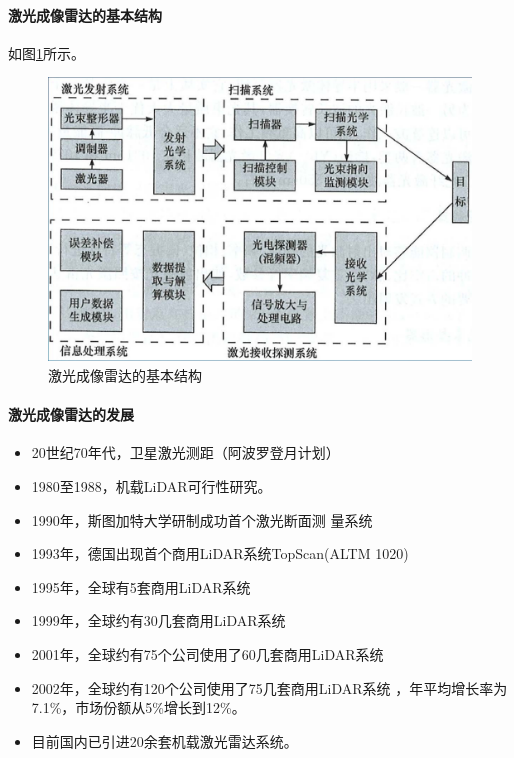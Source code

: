 \paragraph{激光成像雷达的基本结构} 如图\ref{fig:激光成像雷达的基本结构}所示。
\begin{figure}[htbp]
	\centering
	\includegraphics[width=0.7\linewidth]{figure/Chapter1/激光成像雷达的基本结构.jpg}
	\caption{激光成像雷达的基本结构}
	\label{fig:激光成像雷达的基本结构}
\end{figure}
\paragraph{激光成像雷达的发展}
\begin{itemize}
	\item 20世纪70年代，卫星激光测距（阿波罗登月计划）
	\item 1980至1988，机载LiDAR可行性研究。
	\item 1990年，斯图加特大学研制成功首个激光断面测 量系统
	\item 1993年，德国出现首个商用LiDAR系统TopScan(ALTM 1020)
	\item 1995年，全球有5套商用LiDAR系统
	\item 1999年，全球约有30几套商用LiDAR系统
	\item 2001年，全球约有75个公司使用了60几套商用LiDAR系统
	\item 2002年，全球约有120个公司使用了75几套商用LiDAR系统 ，年平均增长率为7.1\%，市场份额从5\%增长到12\%。
	\item 目前国内已引进20余套机载激光雷达系统。
\end{itemize}
